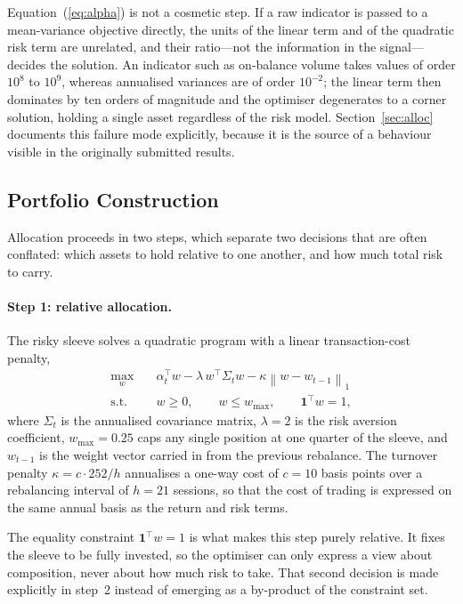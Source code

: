 Equation~(\ref{eq:alpha}) is not a cosmetic step. If a raw indicator is passed to a
mean-variance objective directly, the units of the linear term and of the quadratic
risk term are unrelated, and their ratio---not the information in the signal---decides
the solution. An indicator such as on-balance volume takes values of order $10^{8}$ to
$10^{9}$, whereas annualised variances are of order $10^{-2}$; the linear term then
dominates by ten orders of magnitude and the optimiser degenerates to a corner
solution, holding a single asset regardless of the risk model. Section~\ref{sec:alloc}
documents this failure mode explicitly, because it is the source of a behaviour visible
in the originally submitted results.

\subsection{Portfolio Construction}

Allocation proceeds in two steps, which separate two decisions that are often conflated:
which assets to hold relative to one another, and how much total risk to carry.

\paragraph{Step 1: relative allocation.} The risky sleeve solves a quadratic program
with a linear transaction-cost penalty,
\begin{align}
\max_{w} \quad & \alpha_t^{\top} w - \lambda \, w^{\top} \Sigma_t w
- \kappa \left\| w - w_{t-1} \right\|_1 \\
\text{s.t.} \quad & w \geq 0, \qquad w \leq w_{\max}, \qquad \mathbf{1}^{\top} w = 1,
\end{align}
where $\Sigma_t$ is the annualised covariance matrix, $\lambda = 2$ is the risk
aversion coefficient, $w_{\max} = 0.25$ caps any single position at one quarter of the
sleeve, and $w_{t-1}$ is the weight vector carried in from the previous rebalance. The
turnover penalty $\kappa = c \cdot 252 / h$ annualises a one-way cost of $c = 10$ basis
points over a rebalancing interval of $h = 21$ sessions, so that the cost of trading is
expressed on the same annual basis as the return and risk terms.

The equality constraint $\mathbf{1}^{\top} w = 1$ is what makes this step purely
relative. It fixes the sleeve to be fully invested, so the optimiser can only express a
view about composition, never about how much risk to take. That second decision is made
explicitly in step~2 instead of emerging as a by-product of the constraint set.


